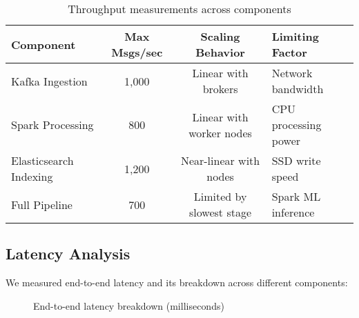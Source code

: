 \documentclass[11pt, a4paper]{article}
\begin{document}
\begin{table}[h]
  \centering
  \begin{tcolorbox}[
    enhanced,
    colback=white,
    colframe=lightgray,
    arc=0mm,
    boxrule=1pt
  ]
  \begin{tabular}{@{}lccl@{}}
    \toprule
    \rowcolor{lightgray!40}\textbf{Component} & \textbf{Max Msgs/sec} & \textbf{Scaling Behavior} & \textbf{Limiting Factor} \\
    \midrule
    Kafka Ingestion & 1,000 & Linear with brokers & Network bandwidth \\
    Spark Processing & 800 & Linear with worker nodes & CPU processing power \\
    Elasticsearch Indexing & 1,200 & Near-linear with nodes & SSD write speed \\
    Full Pipeline & 700 & Limited by slowest stage & Spark ML inference \\
    \bottomrule
  \end{tabular}
  \end{tcolorbox}
  \caption{Throughput measurements across components}
  \label{tab:throughput}
\end{table}

\subsection{Latency Analysis}
We measured end-to-end latency and its breakdown across different components:

\begin{figure}[h]
  \centering
  \caption{End-to-end latency breakdown (milliseconds)}
  \label{fig:latency_chart}
\end{figure}
\end{document}
